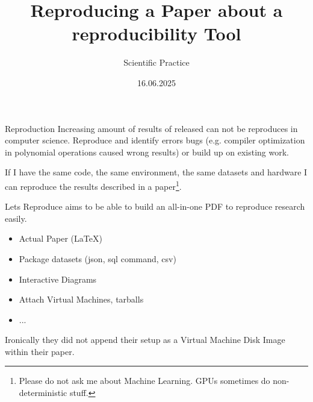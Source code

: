 \documentclass[aspectratio=169]{beamer}
\title{Reproducing a Paper about a reproducibility Tool}
\subtitle{Scientific Practice}
\date{16.06.2025}
\begin{document}
{
\frame{\titlepage}
}

\begin{frame}{Reproduction}
    Increasing amount of results of released can not be reproduces in computer science.
    Reproduce and identify errors bugs (e.g. compiler optimization in polynomial operations caused wrong results) or build up on existing work.

    If I have the same code, the same environment, the same datasets and hardware I can reproduce the results described in a paper\footnote{Please do not ask me about Machine Learning. GPUs sometimes do non-deterministic stuff.}.
\end{frame}


\begin{frame}{Lets Reproduce}
     aims to be able to build an all-in-one PDF to reproduce research easily.
    \begin{itemize}
        \item Actual Paper (\LaTeX)
        \item Package datasets (json, sql command, csv)
        \item Interactive Diagrams
        \item Attach Virtual Machines, tarballs
        \item ...
    \end{itemize}
    Ironically they did not append their setup as a Virtual Machine Disk Image within their paper.
\end{frame}
\end{document}
